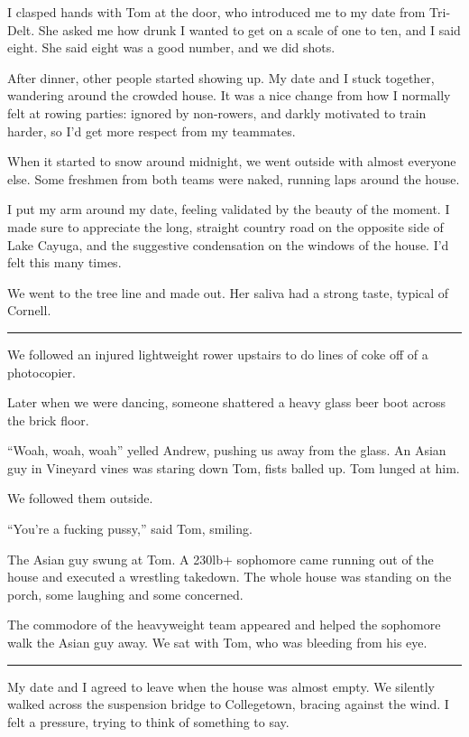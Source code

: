 I clasped hands with Tom at the door, who introduced me to my date from
Tri-Delt.  She asked me how drunk I wanted to get on a scale of one to ten, and
I said eight.  She said eight was a good number, and we did shots.  

After dinner, other people started showing up.  My date and I stuck together,
wandering around the crowded house.  It was a nice change from how I normally
felt at rowing parties: ignored by non-rowers, and darkly motivated to train
harder, so I'd get more respect from my teammates.

When it started to snow around midnight, we went outside with almost everyone
else.  Some freshmen from both teams were naked, running laps around the house.

I put my arm around my date, feeling validated by the beauty of the moment.  I
made sure to appreciate the long, straight country road on the opposite side of
Lake Cayuga, and the suggestive condensation on the windows of the house.  I'd
felt this many times. 

We went to the tree line and made out.  Her saliva had a strong taste, typical
of Cornell.

\plainfancybreak{12pt}{2}{}


We followed an injured lightweight rower upstairs to do lines of coke off of a
photocopier. 

Later when we were dancing, someone shattered a heavy glass beer boot across the
brick floor.  

``Woah, woah, woah'' yelled Andrew, pushing us away from the glass.  An Asian
guy in Vineyard vines was staring down Tom, fists balled up.  Tom lunged at him.

We followed them outside.

``You're a fucking pussy,'' said Tom, smiling.

The Asian guy swung at Tom.  A 230lb+ sophomore came running out of the house
and executed a wrestling takedown.  The whole house was standing on the porch,
some laughing and some concerned.

The commodore of the heavyweight team appeared and helped the sophomore walk the
Asian guy away.  We sat with Tom, who was bleeding from his eye.

\plainfancybreak{12pt}{2}{}

My date and I agreed to leave when the house was almost empty.  We silently
walked across the suspension bridge to Collegetown, bracing against the wind.  I
felt a pressure, trying to think of something to say.

